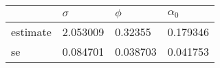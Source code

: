 \begin{tabular}{llll}
\toprule
{} &  $\sigma$ &    $\phi$ & $\alpha_0$ \\
\midrule
estimate &  2.053009 &   0.32355 &   0.179346 \\
se       &  0.084701 &  0.038703 &   0.041753 \\
\bottomrule
\end{tabular}
